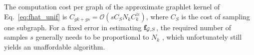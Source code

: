 \documentclass{article}
\begin{document}
The computation cost per graph of the approximate graphlet kernel of Eq.~\eqref{eq:fhat_unif} is $C_{gk + gs}= \mathcal{O}\left(s C_S N_k C^{\cong}_k\right)$, where $C_S$ is the cost of sampling one subgraph. %
For a fixed error in estimating $\mathbf{f}_{\mathcal{G},S}$, the required number of samples $s$ generally needs to be proportional to $N_k$ \cite{graphlet_kernel}, which unfortunately still yields an unaffordable algorithm.


\end{document}
